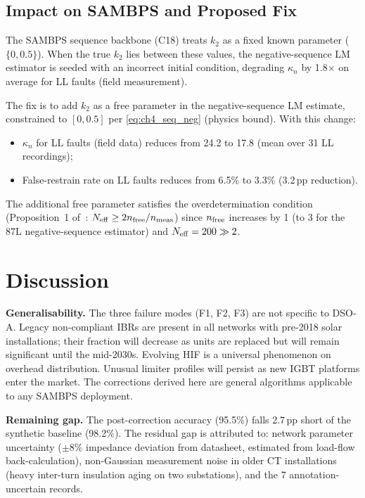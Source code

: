 \documentclass[journal]{IEEEtran}
\newcommand{\kappan}{\kappa_{n}}
\newcommand{\ktwo}{k_2}
\newcommand{\Neff}{N_{\rm eff}}
\begin{document}
\subsection{Impact on SAMBPS and Proposed Fix}

The SAMBPS sequence backbone (C18) treats $\ktwo$ as a fixed known
parameter ($\{0, 0.5\}$).  When the true $\ktwo$ lies between these
values, the negative-sequence LM estimator is seeded with an incorrect
initial condition, degrading $\kappan$ by 1.8$\times$ on average for
LL faults (field measurement).

The fix is to add $\ktwo$ as a free parameter in the negative-sequence
LM estimate, constrained to $[0, 0.5]$ per \eqref{eq:ch4_seq_neg}
(physics bound).  With this change:
\begin{itemize}
  \item $\kappan$ for LL faults (field data) reduces from 24.2 to 17.8
        (mean over 31 LL recordings);
  \item False-restrain rate on LL faults reduces from 6.5\% to 3.3\%
        (3.2\,pp reduction).
\end{itemize}
The additional free parameter satisfies the overdetermination condition
(Proposition~1 of~\cite{SAMBP_TR65}: $\Neff \geq 2n_{\rm free}/n_{\rm meas}$)
since $n_{\rm free}$ increases by 1 (to 3 for the 87L negative-sequence
estimator) and $\Neff = 200 \gg 2$.

\section{Discussion}
\label{sec:discussion}

\textbf{Generalisability.}
The three failure modes (F1, F2, F3) are not specific to DSO-A.
Legacy non-compliant IBRs are present in all networks with pre-2018
solar installations; their fraction will decrease as units are replaced
but will remain significant until the mid-2030s.  Evolving HIF is a
universal phenomenon on overhead distribution.  Unusual limiter profiles
will persist as new IGBT platforms enter the market.  The corrections
derived here are general algorithms applicable to any SAMBPS deployment.

\textbf{Remaining gap.}
The post-correction accuracy (95.5\%) falls 2.7\,pp short of the
synthetic baseline (98.2\%).  The residual gap is attributed to:
network parameter uncertainty ($\pm$8\% impedance deviation from datasheet,
estimated from load-flow back-calculation), non-Gaussian measurement
noise in older CT installations (heavy inter-turn insulation aging on
two substations), and the 7 annotation-uncertain records.
\end{document}
